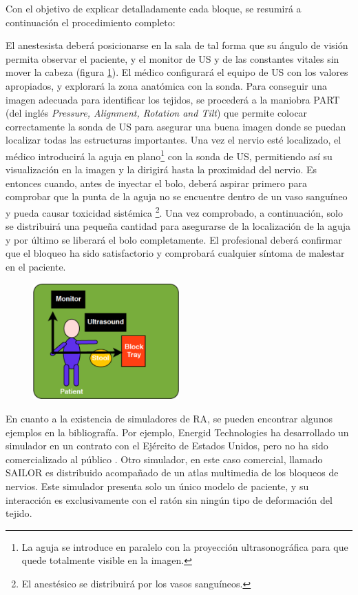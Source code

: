 Con el objetivo de explicar detalladamente cada bloque, se resumirá a continuación el procedimiento completo:

El anestesista deberá posicionarse en la sala de tal forma que su ángulo de visión permita observar el paciente, y el monitor de \ac{US} y de las constantes vitales sin mover la cabeza (figura \ref{fig:roomplace}). El médico configurará el equipo de \ac{US} con los valores apropiados, y explorará la zona anatómica con la sonda. Para conseguir una imagen adecuada para identificar los tejidos, se procederá a la maniobra PART (del inglés \emph{Pressure, Alignment, Rotation and Tilt}) que permite colocar correctamente la sonda de \ac{US} para asegurar una buena imagen donde se puedan localizar todas las estructuras importantes. Una vez el nervio esté localizado, el médico introducirá la aguja en plano\footnote{La aguja se introduce en paralelo con la proyección ultrasonográfica para que quede totalmente visible en la imagen.} con la sonda de \ac{US}, permitiendo así su visualización en la imagen y la dirigirá hasta la proximidad del nervio. Es entonces cuando, antes de inyectar el bolo, deberá aspirar primero para comprobar que la punta de la aguja no se encuentre dentro de un vaso sanguíneo y pueda causar toxicidad sistémica \footnote{El anestésico se distribuirá por los vasos sanguíneos.}. Una vez comprobado, a continuación, solo se distribuirá una pequeña cantidad para asegurarse de la localización de la aguja y por último se liberará el bolo completamente. El profesional deberá confirmar que el bloqueo ha sido satisfactorio y comprobará cualquier síntoma de malestar en el paciente.


\begin{figure}[th]
   \centering
    \includegraphics[width=0.5\textwidth]{IMG/roomplacement.png}
    \caption{ }
   \label{fig:roomplace}
\end{figure}


En cuanto a la existencia de simuladores de \ac{RA}, se pueden encontrar algunos ejemplos en la bibliografía. Por ejemplo, Energid Technologies ha desarrollado  un simulador en un contrato con el Ejército de Estados Unidos, pero no ha sido comercializado al público \cite{lim2008simulation}.
Otro simulador, en este caso comercial, llamado SAILOR es distribuido acompañado de un atlas multimedia de los bloqueos de nervios. Este simulador presenta solo un único modelo de paciente, y su interacción es exclusivamente con el ratón sin ningún tipo de deformación del tejido\cite{Bibin}. 

